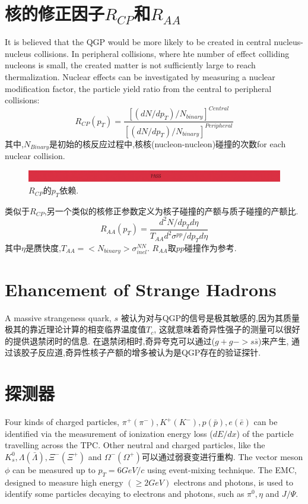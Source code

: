 \section{核的修正因子$R_{CP}$和$R_{AA}$}
It is believed that the QGP would be more likely to be created in central nucleus-nucleus collisions.
In peripheral collisions, where hte number of effect colliding nucleons is small,
the created matter is not sufficiently large to reach thermalization.
Nuclear effects can be investigated by measuring a nuclear modification factor,
the particle yield ratio from the central to peripheral collisions:
\begin{equation}
  \label{eq:2}
  R_{CP}(p_{T}) = \frac{[(dN/dp_{T})/N_{binary}]^{Central}}{[(dN/dp_{T})/N_{binary}]^{Peripheral}}
\end{equation}
其中,$N_{Binary}$是初始的核反应过程中,核核(nucleon-nucleon)碰撞的次数for each nuclear collision.
\begin{figure}[hbtp]
  \centering
  \includegraphics[width=\linewidth]{pictures/pass.pdf}
  \caption{$R_{CP}$的$p_{T}$依赖.}
  \label{fig:Rcp}
\end{figure}
类似于$R_{CP}$,另一个类似的核修正参数定义为核子碰撞的产额与质子碰撞的产额比.
\begin{equation}
  \label{eq:3}
  R_{AA}(p_{T}) = \frac{d^{2}N/dp_{T}d\eta}{T_{AA}d^{2}\sigma^{pp}/dp_{T}d\eta}
\end{equation}
其中$\eta$是赝快度,$T_{AA} = <N_{binary}>\sigma_{inel}^{NN}$.
$R_{AA}$取$pp$碰撞作为参考.

\section{Ehancement of Strange Hadrons}
A massive strangeness quark, $s$ 被认为对与QGP的信号是极其敏感的,因为其质量极其的靠近理论计算的相变临界温度值$T_{c}$,%
这就意味着奇异性强子的测量可以很好的提供退禁闭时的信息.
在退禁闭相时,奇异夸克可以通过($g+g -> s\bar{s}$)来产生,
通过该胶子反应道,奇异性核子产额的增多被认为是QGP存在的验证探针.

\section{探测器}
Four kinds of charged particles, $\pi^{+}(\pi^{-}), K^{+}(K^{-}), p(\bar{p}), e(\bar{e})$ can be identified via the measurement of ionization energy loss ($dE/dx$) of the particle travelling across the TPC.
Other neutral and charged particles, like the $K^{0}_{s}, \Lambda(\bar{\Lambda}), \Xi^{-}(\Xi^{+})$ and $\Omega^{-}(\Omega^{+})$可以通过弱衰变进行重构.
The vector meson $\phi$ can be measured up to $p_{T} = 6 GeV/c$ using event-mixing technique.
The EMC, designed to measure high energy $(\geq 2 GeV)$ electrons and photons,
is used to identify some particles decaying to electrons and photons,
such as $\pi^{0}, \eta$ and $J/\Psi$.

